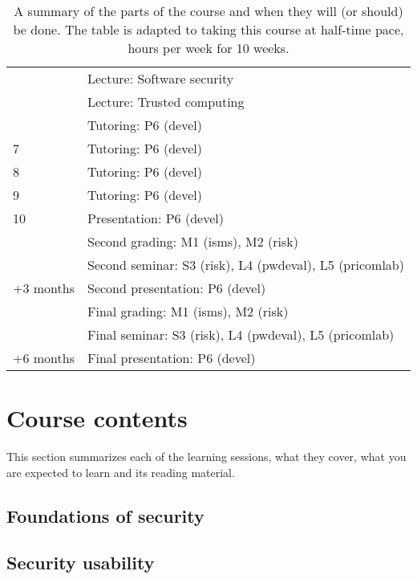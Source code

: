 \begin{table}
\begin{tabular}{lp{9cm}}
      & Lecture: Software security\\
      & Lecture: Trusted computing\\
      & Tutoring: P6 (devel)\\
    \midrule
    7
      & Tutoring: P6 (devel)\\
    \midrule
    8
      & Tutoring: P6 (devel)\\
    \midrule
    9
      & Tutoring: P6 (devel)\\
    \midrule
    10
      & Presentation: P6 (devel)\\
      & Second grading: M1 (isms), M2 (risk)\\
      & Second seminar: S3 (risk), L4 (pwdeval), L5 (pricomlab)\\
    \midrule
    +3 months
      & Second presentation: P6 (devel)\\
      & Final grading: M1 (isms), M2 (risk)\\
      & Final seminar: S3 (risk), L4 (pwdeval), L5 (pricomlab)\\
    \midrule
    +6 months
      & Final presentation: P6 (devel)\\
    \bottomrule
  \end{tabular}
  \caption{%
    A summary of the parts of the course and when they will (or should) be done.
    The table is adapted to taking this course at half-time pace,  hours 
    per week for 10 weeks.
  }\label{Schedule}
\end{table}


\section{Course contents}%
\label{CourseContents}

This section summarizes each of the learning sessions, \ie what they cover, 
what you are expected to learn and its reading material.

%
%
\subsection{Foundations of security}


\subsection{Security usability}



